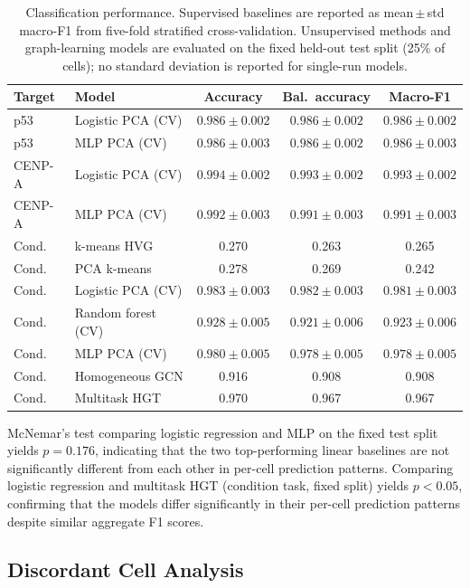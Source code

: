 \begin{table}[ht]
\centering
\small
\caption{Classification performance. Supervised baselines are reported as
mean\,$\pm$\,std macro-F1 from five-fold stratified cross-validation. Unsupervised
methods and graph-learning models are evaluated on the fixed held-out test split
(25\% of cells); no standard deviation is reported for single-run models.}
\label{tab:baselines}
\begin{tabular}{llccc}
\toprule
Target & Model & Accuracy & Bal.\ accuracy & Macro-F1 \\
\midrule
p53    & Logistic PCA (CV) & $0.986 \pm 0.002$ & $0.986 \pm 0.002$ & $0.986 \pm 0.002$ \\
p53    & MLP PCA (CV)      & $0.986 \pm 0.003$ & $0.986 \pm 0.002$ & $0.986 \pm 0.003$ \\
CENP-A & Logistic PCA (CV) & $0.994 \pm 0.002$ & $0.993 \pm 0.002$ & $0.993 \pm 0.002$ \\
CENP-A & MLP PCA (CV)      & $0.992 \pm 0.003$ & $0.991 \pm 0.003$ & $0.991 \pm 0.003$ \\
\midrule
Cond.  & k-means HVG       & 0.270 & 0.263 & 0.265 \\
Cond.  & PCA k-means       & 0.278 & 0.269 & 0.242 \\
Cond.  & Logistic PCA (CV) & $0.983 \pm 0.003$ & $0.982 \pm 0.003$ & $0.981 \pm 0.003$ \\
Cond.  & Random forest (CV)& $0.928 \pm 0.005$ & $0.921 \pm 0.006$ & $0.923 \pm 0.006$ \\
Cond.  & MLP PCA (CV)      & $0.980 \pm 0.005$ & $0.978 \pm 0.005$ & $0.978 \pm 0.005$ \\
Cond.  & Homogeneous GCN   & 0.916 & 0.908 & 0.908 \\
Cond.  & Multitask HGT     & 0.970 & 0.967 & 0.967 \\
\bottomrule
\end{tabular}
\end{table}

McNemar's test comparing logistic regression and MLP on the fixed test split
yields $p=0.176$, indicating that the two top-performing linear baselines are
not significantly different from each other in per-cell prediction patterns.
Comparing logistic regression and multitask HGT (condition task, fixed split)
yields $p<0.05$, confirming that the models differ significantly in their
per-cell prediction patterns despite similar aggregate F1 scores.

\subsection{Discordant Cell Analysis}

